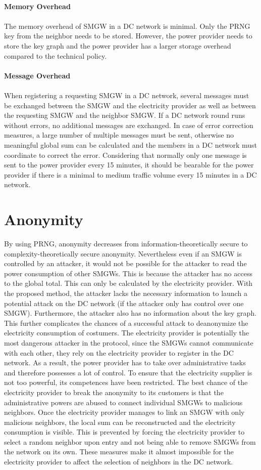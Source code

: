\\
\textbf{Memory Overhead}
\\
\\
The memory overhead of SMGW in a DC network is minimal. Only the PRNG key from the neighbor needs to be stored. However, the power provider needs to store the key graph and the power provider has a larger storage overhead compared to the technical policy. 
\\
\\
\textbf{Message Overhead}
\\
\\
When registering a requesting SMGW in a DC network, several messages must be exchanged between the SMGW and the electricity provider as well as between the requesting SMGW and the neighbor SMGW. If a DC network round runs without errors, no additional messages are exchanged.
In case of error correction measures, a large number of multiple messages must be sent, otherwise no meaningful global sum can be calculated and the members in a DC network must coordinate to correct the error. Considering that normally only one message is sent to the power provider every 15 minutes, it should be bearable for the power provider if there is a minimal to medium traffic volume every 15 minutes in a DC network.
\section{Anonymity}
By using PRNG, anonymity decreases from information-theoretically secure to complexity-theoretically secure anonymity. Nevertheless even if an SMGW is controlled by an attacker, it would not be possible for the attacker to read the power consumption of other SMGWs. This is because the attacker has no access to the global total. This can only be calculated by the electricity provider. With the proposed method, the attacker lacks the necessary information to launch a potential attack on the DC network (if the attacker only has control over one SMGW). Furthermore, the attacker also has no information about the key graph. This further complicates the chances of a successful attack to deanonymize the electricity consumption of costumers. The electricity provider is potentially the most dangerous attacker in the protocol, since the SMGWs cannot communicate with each other, they rely on the electricity provider to register in the DC network. As a result, the power provider has to take over administrative tasks and therefore possesses a lot of control. To ensure that the electricity supplier is not too powerful, its competences have been restricted. The best chance of the electricity provider to break the anonymity to its customers is that the administrative powers are abused to connect individual SMGWs to malicious neighbors. Once the electricity provider manages to link an SMGW with only malicious neighbors, the local sum can be reconstructed and the electricity consumption is visible. This is prevented by forcing the electricity provider to select a random neighbor upon entry and not being able to remove SMGWs from the network on its own. These measures make it almost impossible for the electricity provider to affect the selection of neighbors in the DC network.


\cleardoublepage

